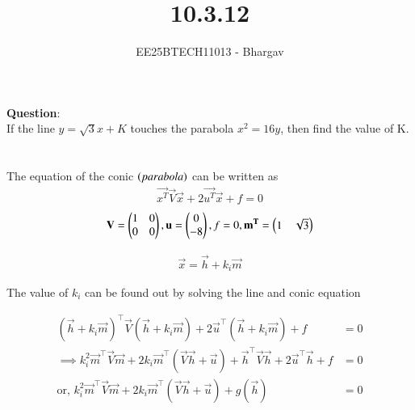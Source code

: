 \documentclass[journal]{IEEEtran}
\begin{document}

\vspace{3cm}

\title{10.3.12}
\author{EE25BTECH11013 - Bhargav}
\maketitle
    {\let\newpage\relax\maketitle}

\renewcommand{\thefigure}{\theenumi}
\renewcommand{\thetable}{\theenumi}
\setlength{\intextsep}{10pt} %

\renewcommand{\thetable}{\theenumi}

\textbf{Question}: \\
If the line $y = \sqrt{3}x + K$ touches the parabola $x^2 = 16y$, then find the value of K.\\ \\
\solution \\

The equation of the conic $\left(parabola\right)$ can be written as
\begin{align}
\vec{x^T}\vec{V}\vec{x} + 2\vec{u^T}\vec{x} + f = 0
\end{align}
\begin{align}
\mathbf{V} = \begin{pmatrix}1 & 0 \\ 0 & 0\end{pmatrix}, \mathbf{u} = \begin{pmatrix}0 \\ -8\end{pmatrix}, f=0, \mathbf{m^T} = \begin{pmatrix}1 & \sqrt{3}\end{pmatrix}
\end{align}

\begin{align}
\vec{x} = \vec{h} + k_i\vec{m}    
\end{align}

The value of $k_i$ can be found out by solving the line and conic equation

\begin{align}
(\vec{h} + k_i \vec{m})^{\top} \vec{V} (\vec{h} + k_i \vec{m}) + 2\vec{u}^{\top} (\vec{h} + k_i \vec{m}) + f &= 0 \\
\implies k_i^{2} \vec{m}^{\top}\vec{V}\vec{m} + 2k_i \vec{m}^{\top} (\vec{V}\vec{h} + \vec{u}) + \vec{h}^{\top}\vec{V}\vec{h} + 2\vec{u}^{\top}\vec{h} + f &= 0 \\
\text{or, } k_i^{2} \vec{m}^{\top}\vec{V}\vec{m} + 2k_i \vec{m}^{\top} (\vec{V}\vec{h} + \vec{u}) + g(\vec{h}) &= 0
\end{align}
\end{document}
